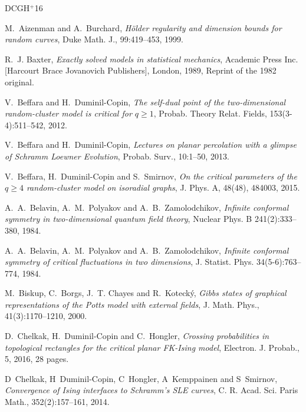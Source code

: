 \documentclass[a4paper,oneside,11pt]{article}
\numberwithin{equation}{section}
\numberwithin{equation}{section}
\numberwithin{equation}{section}
\begin{document}
\newcommand{\etalchar}[1]{$^{#1}$}
\providecommand{\bysame}{\leavevmode\hbox to3em{\hrulefill}\thinspace}
\providecommand{\MR}{\relax\ifhmode\unskip\space\fi MR }
\providecommand{\MRhref}[2]{%
  \href{http://www.ams.org/mathscinet-getitem?mr=#1}{#2}
}
\providecommand{\href}[2]{#2}
\begin{thebibliography}{DCGH{\etalchar{+}}16}

M.~Aizenman and A.~Burchard, 
{\em H\"older regularity and dimension bounds for random curves},
Duke Math. J., 99:419--453, 1999. 

R.~J. Baxter, \emph{Exactly solved models in statistical mechanics},
Academic Press Inc. [Harcourt Brace Jovanovich Publishers], London, 1989,
Reprint of the 1982 original. 

V.~Beffara and H.~Duminil-Copin, 
\emph{The self-dual point of the two-dimensional random-cluster model is critical for {$q\geq 1$}}, 
Probab. Theory Relat. Fields, 153(3-4):511--542, 2012. 

V.~Beffara and H.~{Duminil-Copin},
{\em Lectures on planar percolation with a glimpse of {S}chramm {L}oewner {E}volution},
Probab. Surv., 10:1--50, 2013.

V.~Beffara, H.~Duminil-Copin and S.~Smirnov, 
\emph{On the critical parameters of the $q\ge4$ random-cluster model on isoradial graphs}, 
J. Phys. A, 48(48), 484003, 2015.

A.~A.~Belavin, A.~M.~Polyakov and A.~B.~Zamolodchikov, 
{\em Infinite conformal symmetry in two-dimensional quantum field theory}, 
Nuclear Phys. B 241(2):333--380, 1984.

A.~A.~Belavin, A.~M.~Polyakov and A.~B.~Zamolodchikov, 
{\em Infinite conformal symmetry of critical fluctuations in two dimensions}, 
J. Statist. Phys. 34(5-6):763--774, 1984. 

M.~Biskup, C.~Borgs, J.~T. Chayes and R.~Koteck{\'y}, 
\emph{Gibbs states of graphical representations of the {P}otts model with external fields}, 
J. Math. Phys., 41(3):1170--1210, 2000.

D.~Chelkak, H.~{Duminil-Copin} and C.~Hongler,
{\em Crossing probabilities in topological rectangles for the critical planar {FK}-{I}sing model},
Electron. J. Probab., 5, 2016, 28 pages.

D~Chelkak, H~Duminil-Copin, C~Hongler, A~Kemppainen and S~Smirnov,
\emph{Convergence of {I}sing interfaces to {S}chramm's {SLE} curves},
{C. R. Acad. Sci. Paris Math.}, 352(2):157--161, 2014.


\end{thebibliography}
\end{document}
